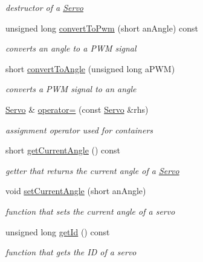 \begin{DoxyCompactItemize}
\begin{DoxyCompactList}\small\item\em destructor of a \hyperlink{classRobotInterface_1_1HighLevel_1_1Servo}{Servo} \end{DoxyCompactList}\item 
unsigned long \hyperlink{classRobotInterface_1_1HighLevel_1_1Servo_a2b2c9e642fe5c546bcff661dc2a3c3be}{convert\+To\+Pwm} (short an\+Angle) const 
\begin{DoxyCompactList}\small\item\em converts an angle to a P\+WM signal \end{DoxyCompactList}\item 
short \hyperlink{classRobotInterface_1_1HighLevel_1_1Servo_aa21ba9d390292c8d89cac23ba0fe0ba4}{convert\+To\+Angle} (unsigned long a\+P\+WM)
\begin{DoxyCompactList}\small\item\em converts a P\+WM signal to an angle \end{DoxyCompactList}\item 
\hyperlink{classRobotInterface_1_1HighLevel_1_1Servo}{Servo} \& \hyperlink{classRobotInterface_1_1HighLevel_1_1Servo_a4d4cc819ba46142c6c3c484748564f4d}{operator=} (const \hyperlink{classRobotInterface_1_1HighLevel_1_1Servo}{Servo} \&rhs)
\begin{DoxyCompactList}\small\item\em assignment operator used for containers \end{DoxyCompactList}\item 
short \hyperlink{classRobotInterface_1_1HighLevel_1_1Servo_a2baa9e28317f6082132558892cb9feef}{get\+Current\+Angle} () const 
\begin{DoxyCompactList}\small\item\em getter that returns the current angle of a \hyperlink{classRobotInterface_1_1HighLevel_1_1Servo}{Servo} \end{DoxyCompactList}\item 
void \hyperlink{classRobotInterface_1_1HighLevel_1_1Servo_a4767afffc5c122d9781444680e9314fe}{set\+Current\+Angle} (short an\+Angle)
\begin{DoxyCompactList}\small\item\em function that sets the current angle of a servo \end{DoxyCompactList}\item 
unsigned long \hyperlink{classRobotInterface_1_1HighLevel_1_1Servo_a4c7c2e4b7538f50e415705221be50aa8}{get\+Id} () const 
\begin{DoxyCompactList}\small\item\em function that gets the ID of a servo \end{DoxyCompactList}\item 

\end{DoxyCompactItemize}
